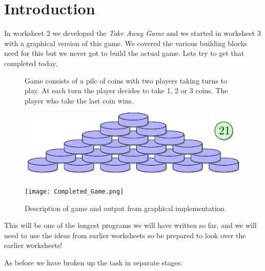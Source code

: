 \documentclass{coderdojo}
\begin{document}
\maketitle


\section*{Introduction}

In worksheet 2 we developed the {\em Take Away Game} and we started in worksheet 3 with a graphical version of this game. We covered the various building blocks need for this but we never got to build the actual game. Lets try to get that completed today.

\begin{figure}[H]
\begin{minipage}{.5\textwidth}
\begin{exercise}
Game consists of a pile of coins with two players taking turns to play. At each turn the player decides to take 1, 2 or 3 coins.  The player who take the last coin wins.

\centerline {\includegraphics[page=12]{take_away_game}}
\end{exercise}
\end{minipage}
\begin{minipage}{.5\textwidth}
\centerline {\texttt{[image: Completed\_Game.png]}}
\end{minipage}
\caption{Description of game and output from graphical implementation.}
\end{figure}

\vspace{12pt}
This will be one of the longest programs we will have written so far, and we will need to use the ideas from earlier worksheets so be prepared to look over the earlier worksheets!

As before we have broken up the task in separate stages:
\end{document}
